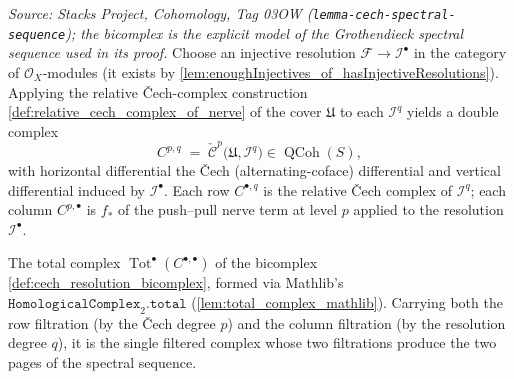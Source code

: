 \begin{definition}
  \label{def:cech_resolution_bicomplex}
  \textit{Source: Stacks Project, Cohomology, Tag 03OW
  (\texttt{lemma-cech-spectral-sequence}); the bicomplex is the explicit model of the
  Grothendieck spectral sequence used in its proof.}
  Choose an injective resolution \(\mathcal{F} \to \mathcal{I}^\bullet\) in the
  category of \(\mathcal{O}_X\)-modules (it exists by
  \cref{lem:enoughInjectives_of_hasInjectiveResolutions}). Applying the relative
  {\v C}ech-complex construction \cref{def:relative_cech_complex_of_nerve} of the cover
  \(\mathfrak{U}\) to each \(\mathcal{I}^q\) yields a double complex
  \[
    C^{p,q} \;=\; \check{\mathcal{C}}^p\bigl(\mathfrak{U}, \mathcal{I}^q\bigr)
    \in \operatorname{QCoh}(S),
  \]
  with horizontal differential the {\v C}ech (alternating-coface) differential and
  vertical differential induced by \(\mathcal{I}^\bullet\). Each row \(C^{\bullet,q}\)
  is the relative {\v C}ech complex of \(\mathcal{I}^q\); each column \(C^{p,\bullet}\)
  is \(f_*\) of the push--pull nerve term at level \(p\) applied to the resolution
  \(\mathcal{I}^\bullet\).
\end{definition}

\begin{definition}
  \label{def:cech_resolution_total_complex}
  The total complex \(\operatorname{Tot}^\bullet(C^{\bullet,\bullet})\) of the
  bicomplex \cref{def:cech_resolution_bicomplex}, formed via Mathlib's
  \(\texttt{HomologicalComplex}_2.\texttt{total}\)
  (\cref{lem:total_complex_mathlib}). Carrying both the row filtration (by the
  {\v C}ech degree \(p\)) and the column filtration (by the resolution degree \(q\)),
  it is the single filtered complex whose two filtrations produce the two pages of the
  spectral sequence.
\end{definition}

